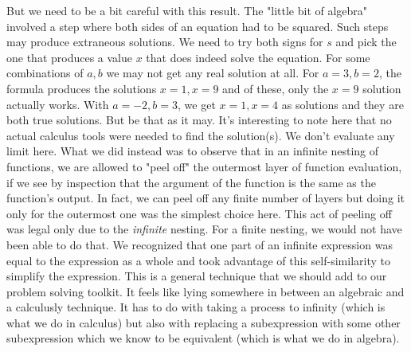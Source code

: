 But we need to be a bit careful with this result. The "little bit of algebra" involved a step where both sides of an equation had to be squared. Such steps may produce extraneous solutions. We need to try both signs for $s$ and pick the one that produces a value $x$ that does indeed solve the equation. For some combinations of $a,b$ we may not get any real solution at all. For $a = 3, b = 2$, the formula produces the solutions $x = 1, x = 9$ and of these, only the $x=9$ solution actually works. With $a = -2, b = 3$, we get $x = 1, x = 4$ as solutions and they are both true solutions. But be that as it may. It's interesting to note here that no actual calculus tools were needed to find the solution(s). We don't evaluate any limit here. What we did instead was to observe that in an infinite nesting of functions, we are allowed to "peel off" the outermost layer of function evaluation, if we see by inspection that the argument of the function is the same as the function's output. In fact, we can peel off any finite number of layers but doing it only for the outermost one was the simplest choice here. This act of peeling off was legal only due to the \emph{infinite} nesting. For a finite nesting, we would not have been able to do that. We recognized that one part of an infinite expression was equal to the expression as a whole and took advantage of this self-similarity to simplify the expression. This is a general technique that we should add to our problem solving toolkit. It feels like lying somewhere in between an algebraic and a calculusly technique. It has to do with taking a process to infinity (which is what we do in calculus) but also with replacing a subexpression with some other subexpression which we know to be equivalent (which is what we do in algebra).





